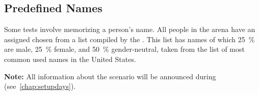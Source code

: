 \subsection{Predefined Names}
\label{sec:rules:scenario:names}
Some tests involve memorizing a person's name. All people in the arena have an assigned \PredefinedName{} chosen from a list compiled by the \TC{}. This list has \NumNames{} names of which \SI{25}{\percent} are male, \SI{25}{\percent} female, and \SI{50}{\percent} gender-neutral, taken from the list of most common used names in the United States.


\textbf{Note:} All information about the scenario will be announced during \SetupDays{} (see~\ref{chap:setupdays}).

